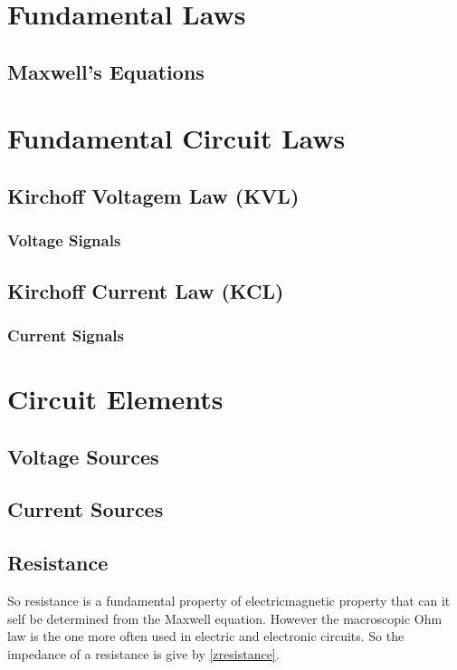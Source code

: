 \documentclass[a4paper]{report}
\begin{document}

\tableofcontents

\chapter{Fundamental Laws}
\newpage
\section{Maxwell's Equations}



\chapter{Fundamental Circuit Laws}
\newpage
\section{Kirchoff Voltagem Law (KVL)}
\subsection{Voltage Signals}
\section{Kirchoff Current Law (KCL)}
\subsection{Current Signals}






\chapter{Circuit Elements}

\section{Voltage Sources}

\section{Current Sources}

\section{Resistance}
So resistance is a fundamental property of electricmagnetic property that can it self be determined from the Maxwell equation. However the macroscopic Ohm law is the one more often used in electric and electronic circuits. So the impedance of a resistance is give by \ref{zresistance}.
\end{document}
